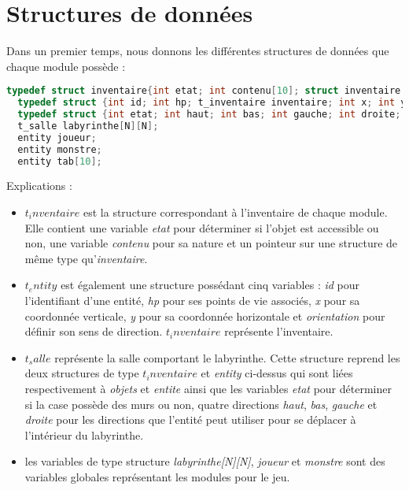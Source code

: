 \documentclass[a4paper,11pt]{report}
\begin{document}
    \section{Structures de données}
    Dans un premier temps, nous donnons les différentes structures de données que chaque module possède :
\begin{lstlisting}[language=c]
  typedef struct inventaire{int etat; int contenu[10]; struct inventaire *locker[10];}t_inventaire;
  typedef struct {int id; int hp; t_inventaire inventaire; int x; int y; int orientation;}entity;
  typedef struct {int etat; int haut; int bas; int gauche; int droite; t_inventaire objets; entity entite;}t_salle;
  t_salle labyrinthe[N][N];
  entity joueur;
  entity monstre;
  entity tab[10]; 
\end{lstlisting}

    Explications :

      \begin{itemize}
        \item $t_inventaire$ est la structure correspondant à l'inventaire de chaque module. Elle contient une variable \textit{etat} pour déterminer si l'objet est accessible ou non, une variable \textit{contenu} pour sa nature et un pointeur sur une structure de même type qu'\textit{inventaire}.
    
        \item $t_entity$ est également une structure possédant cinq variables : \textit{id} pour l'identifiant d'une entité, \textit{hp} pour ses points de vie associés, \textit{x} pour sa coordonnée verticale, \textit{y} pour sa coordonnée horizontale et \textit{orientation} pour définir son sens de direction. $t_inventaire$ représente l'inventaire.
    
        \item $t_salle$ représente la salle comportant le labyrinthe. Cette structure reprend les deux structures de type $t_inventaire$ et \textit{entity} ci-dessus qui sont liées respectivement à \textit{objets} et \textit{entite} ainsi que les variables \textit{etat} pour déterminer si la case possède des murs ou non, quatre directions \textit{haut}, \textit{bas}, \textit{gauche} et \textit{droite} pour les directions que l'entité peut utiliser pour se déplacer à l'intérieur du labyrinthe.
      
        \item les variables de type structure \textit{labyrinthe[N][N]}, \textit{joueur} et \textit{monstre} sont des variables globales représentant les modules pour le jeu.
      \end{itemize}
\end{document}
